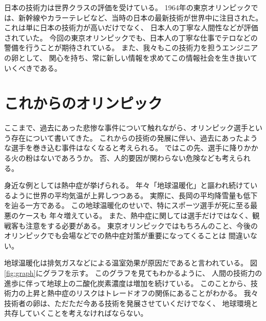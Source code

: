 \documentclass{jsarticle}
\begin{document}
日本の技術力は世界クラスの評価を受けている。
1964年の東京オリンピックでは、新幹線やカラーテレビなど、当時の日本の最新技術が世界中に注目された。
これは単に日本の技術力が高いだけでなく、
日本人の丁寧な人間性などが評価されていた。
今回の東京オリンピックでも、日本人の丁寧な仕事でテロなどの警備を行うことが期待されている。
また、我々もこの技術力を担うエンジニアの卵として、
関心を持ち、常に新しい情報を求めてこの情報社会を生き抜いていくべきである。

\section{これからのオリンピック}
ここまで、過去にあった悲惨な事件について触れながら、オリンピック選手という存在について書いてきた。
これからの技術の発展に伴い、過去にあったような選手を巻き込む事件はなくなると考えられる。
ではこの先、選手に降りかかる火の粉はないであろうか。
否、人的要因が関わらない危険なども考えられる。

身近な例としては熱中症が挙げられる。
年々「地球温暖化」と謳われ続けているように世界の平均気温が上昇しつつある。
実際に、長岡の平均降雪量も低下を辿る一方である。
この地球温暖化のせいで、特にスポーツ選手が死に至る最悪のケースも
年々増えている。
また、熱中症に関しては選手だけではなく、観戦客も注意をする必要がある。
東京オリンピックではもちろんのこと、今後のオリンピックでも会場などでの熱中症対策が重要になってくることは
間違いない。

地球温暖化は排気ガスなどによる温室効果が原因だであると言われている。
図\ref{fig:graph}にグラフを示す。
このグラフを見てもわかるように、
人間の技術力の進歩に伴って地球上の二酸化炭素濃度は増加を続けている。
このことから、技術力の上昇と熱中症のリスクはトレードオフの関係にあることがわかる。
我々技術者の卵は、ただただ今ある技術を発展させていくだけでなく、
地球環境と共存していくことを考えなければならない。
\end{document}
